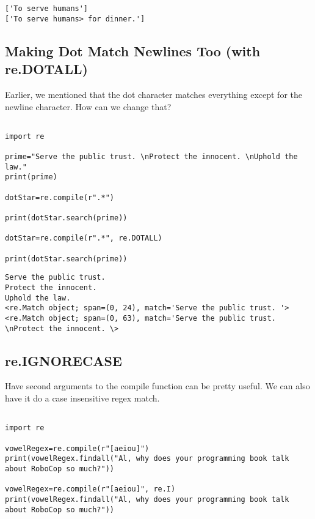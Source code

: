 \documentclass[11pt]{article}
\begin{document}
\begin{verbatim}
['To serve humans']
['To serve humans> for dinner.']
\end{verbatim}

\subsection{Making Dot Match Newlines Too (with re.DOTALL)}
\label{sec:org3b5ab90}

Earlier, we mentioned that the dot character matches everything except for the newline character. How can we change that?

\begin{verbatim}

import re

prime="Serve the public trust. \nProtect the innocent. \nUphold the law."
print(prime)

dotStar=re.compile(r".*")

print(dotStar.search(prime))

dotStar=re.compile(r".*", re.DOTALL)

print(dotStar.search(prime))

\end{verbatim}

\begin{verbatim}
Serve the public trust. 
Protect the innocent. 
Uphold the law.
<re.Match object; span=(0, 24), match='Serve the public trust. '>
<re.Match object; span=(0, 63), match='Serve the public trust. \nProtect the innocent. \>
\end{verbatim}

\subsection{re.IGNORECASE}
\label{sec:orge45ce6c}

Have second arguments to the compile function can be pretty useful. We can also have it do a case insensitive regex match.

\begin{verbatim}

import re

vowelRegex=re.compile(r"[aeiou]")
print(vowelRegex.findall("Al, why does your programming book talk about RoboCop so much?"))

vowelRegex=re.compile(r"[aeiou]", re.I)
print(vowelRegex.findall("Al, why does your programming book talk about RoboCop so much?"))


\end{verbatim}
\end{document}

